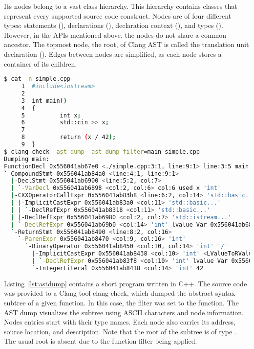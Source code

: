 Its nodes belong to a vast class hierarchy. 
This hierarchy contains classes that represent every supported 
source code construct.
Nodes are of four different types: statements (), 
declarations (), declaration context (),
and types (). 
However, in the APIs mentioned above, the nodes do not share
a common ancestor. 
The topmost node, the root, of Clang AST is called the translation
unit declaration (). 
Edges between nodes are simplified, as each node stores 
a container of its children.

\begin{lstlisting}[caption=Clang AST Dump., language=bash, 
label={lst:astdump}, basicstyle=\tiny, numbers=none]
$ cat -n simple.cpp
     1  #include<iostream>
     2
     3  int main()
     4  {
     5          int x;
     6          std::cin >> x;
     7
     8          return (x / 42);
     9  } 
$ clang-check -ast-dump -ast-dump-filter=main simple.cpp --
Dumping main:
FunctionDecl 0x556041ab67e0 <./simple.cpp:3:1, line:9:1> line:3:5 main 'int ()'
`-CompoundStmt 0x556041ab84a0 <line:4:1, line:9:1>
  |-DeclStmt 0x556041ab6900 <line:5:2, col:7>
  | `-VarDecl 0x556041ab6898 <col:2, col:6> col:6 used x 'int'
  |-CXXOperatorCallExpr 0x556041ab83b8 <line:6:2, col:14> 'std::basic...'
  | |-ImplicitCastExpr 0x556041ab83a0 <col:11> 'std::basic...'
  | | `-DeclRefExpr 0x556041ab8318 <col:11> 'std::basic...'
  | |-DeclRefExpr 0x556041ab6980 <col:2, col:7> 'std::istream...'
  | `-DeclRefExpr 0x556041ab69b0 <col:14> 'int' lvalue Var 0x556041ab6898 'x' 'int'
  `-ReturnStmt 0x556041ab8490 <line:8:2, col:16>
    `-ParenExpr 0x556041ab8470 <col:9, col:16> 'int'
      `-BinaryOperator 0x556041ab8450 <col:10, col:14> 'int' '/'
        |-ImplicitCastExpr 0x556041ab8438 <col:10> 'int' <LValueToRValue>
        | `-DeclRefExpr 0x556041ab83f8 <col:10> 'int' lvalue Var 0x556041ab6898 'x' 'int'
        `-IntegerLiteral 0x556041ab8418 <col:14> 'int' 42
\end{lstlisting}

Listing~\ref{lst:astdump} contains a short program written in C++.
The source code was provided to a Clang tool clang-check, which
dumped the abstract syntax subtree of a given function.
In this case, the filter was set to the  function.
The AST dump visualizes the subtree using ASCII characters
and node information.
Nodes entries start with their type names. 
Each node also carries its address, source location, and description.
Note that the root of the subtree is of type .
The usual root  is absent due to the function
filter being applied.

